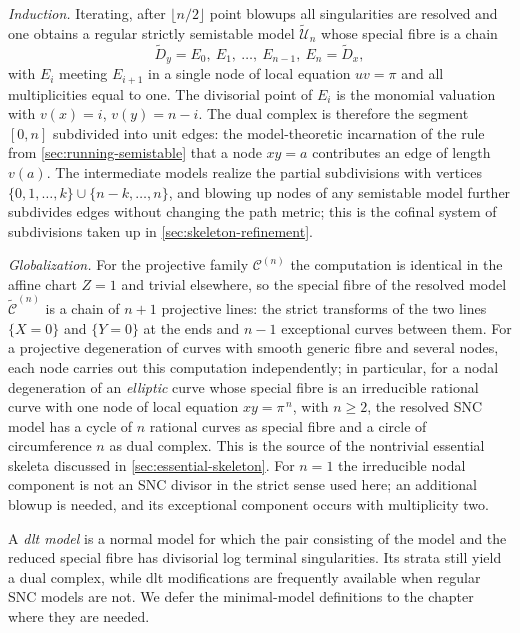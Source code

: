 \begin{example}
\emph{Induction.}  Iterating, after $\lfloor n/2\rfloor$ point blowups all
singularities are resolved and one obtains a regular strictly semistable
model $\widetilde{\mathcal U}_n$ whose special fibre is a chain
\[
     \widetilde D_y=E_0,\ E_1,\ \ldots,\ E_{n-1},\ E_n=\widetilde D_x,
\]
with $E_i$ meeting $E_{i+1}$ in a single node of local equation
$uv=\pi$ and all multiplicities equal to one.  The divisorial point of
$E_i$ is the monomial valuation with $v(x)=i$, $v(y)=n-i$.  The dual
complex is therefore the segment $[0,n]$ subdivided into unit edges: the
model-theoretic incarnation of the rule from
\cref{sec:running-semistable} that a node $xy=a$ contributes an edge of
length $v(a)$.  The intermediate models realize the partial subdivisions
with vertices $\{0,1,\ldots,k\}\cup\{n-k,\ldots,n\}$, and blowing up nodes
of any semistable model further subdivides edges without changing the path
metric; this is the cofinal system of subdivisions taken up in
\cref{sec:skeleton-refinement}.

\emph{Globalization.}  For the projective family $\mathcal C^{(n)}$ the
computation is identical in the affine chart $Z=1$ and trivial elsewhere,
so the special fibre of the resolved model
$\widetilde{\mathcal C}^{(n)}$ is a chain of $n+1$ projective lines: the
strict transforms of the two lines $\{X=0\}$ and $\{Y=0\}$ at the ends and
$n-1$ exceptional curves between them.  For a projective degeneration of
curves with smooth generic fibre and several nodes, each node carries out
this computation independently; in particular, for a nodal degeneration of
an \emph{elliptic} curve whose special fibre is an irreducible rational
curve with one node of local equation $xy=\pi^{\,n}$, with $n\ge2$, the resolved SNC
model has a cycle of $n$ rational curves as special fibre and a circle of
circumference $n$ as dual complex.  This is the source of the nontrivial
essential skeleta discussed in \cref{sec:essential-skeleton}.
For $n=1$ the irreducible nodal component is not an SNC divisor in the
strict sense used here; an additional blowup is needed, and its exceptional
component occurs with multiplicity two.
\end{example}

A \emph{dlt model} is a normal model for which the pair consisting of the
model and the reduced special fibre has divisorial log terminal singularities.
Its strata still yield a dual complex, while dlt modifications are frequently
available when regular SNC models are not. We defer the minimal-model
definitions to the chapter where they are needed.


